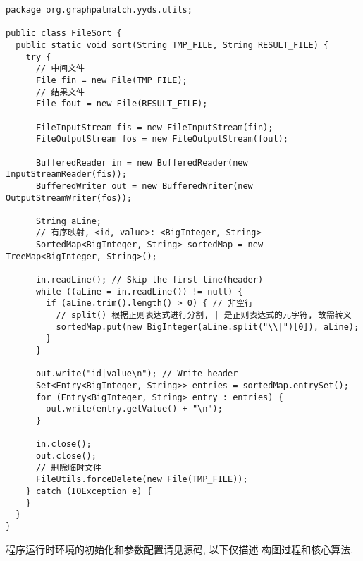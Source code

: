 \begin{center}
\begin{verbatim}
package org.graphpatmatch.yyds.utils;

public class FileSort {
  public static void sort(String TMP_FILE, String RESULT_FILE) {
    try {
      // 中间文件
      File fin = new File(TMP_FILE);
      // 结果文件
      File fout = new File(RESULT_FILE);

      FileInputStream fis = new FileInputStream(fin);
      FileOutputStream fos = new FileOutputStream(fout);

      BufferedReader in = new BufferedReader(new InputStreamReader(fis));
      BufferedWriter out = new BufferedWriter(new OutputStreamWriter(fos));

      String aLine;
      // 有序映射, <id, value>: <BigInteger, String>
      SortedMap<BigInteger, String> sortedMap = new TreeMap<BigInteger, String>();

      in.readLine(); // Skip the first line(header)
      while ((aLine = in.readLine()) != null) {
        if (aLine.trim().length() > 0) { // 非空行
          // split() 根据正则表达式进行分割, | 是正则表达式的元字符, 故需转义
          sortedMap.put(new BigInteger(aLine.split("\\|")[0]), aLine);
        }
      }

      out.write("id|value\n"); // Write header
      Set<Entry<BigInteger, String>> entries = sortedMap.entrySet();
      for (Entry<BigInteger, String> entry : entries) {
        out.write(entry.getValue() + "\n");
      }

      in.close();
      out.close();
      // 删除临时文件
      FileUtils.forceDelete(new File(TMP_FILE));
    } catch (IOException e) {
    }
  }
}
\end{verbatim}
\end{center}

程序运行时环境的初始化和参数配置请见源码, 以下仅描述
构图过程和核心算法.






